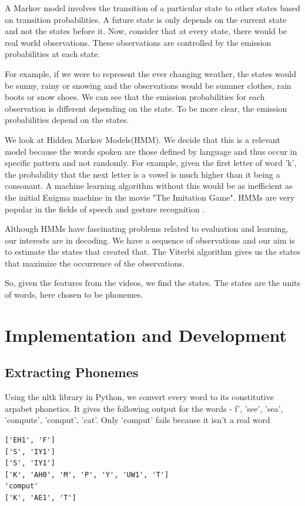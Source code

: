 \documentclass[a4paper]{article}
\begin{document}
A Markov model involves the transition of a particular state to other states based on transition probabilities. A future state is only depends on the current state and not the states before it. Now, consider that at every state, there would be real world observations. These observations are controlled by the emission probabilities at each state.

For example, if we were to represent the ever changing weather, the states would be sunny, rainy or snowing and the observations would be summer clothes, rain boots or snow shoes. We can see that the emission probabilities for each observation is different depending on the state. To be more clear, the emission probabilities depend on the states.

We look at Hidden Markov Models(HMM). We decide that this is a relevant model because the words spoken are those defined by language and thus occur in specific pattern and not randomly. For example, given the first letter of word 'k', the probability that the next letter is a vowel is much higher than it being a consonant. A machine learning algorithm without this would be as inefficient as the initial Enigma machine in the movie "The Imitation Game". HMMs are very popular in the fields of speech \cite{key-2} and gesture recognition \cite{key-4} \cite{key-5}.

Although HMMs have fascinating problems related to evaluation and learning, our interests are in decoding. We have a sequence of observations and our aim is to estimate the states that created that. The Viterbi algorithm \cite{key-3} gives us the states that maximize the occurrence of the observations. 

So, given the features from the videos, we find the states. The states are the units of words, here chosen to be phonemes. 
\section{Implementation and Development}

\subsection{Extracting Phonemes}

Using the nltk library in Python, we convert every word to its constitutive arpabet phonetics. It gives the following output for the words - f', 'see', 'sea', 'compute', 'comput', 'cat'. Only 'comput' fails because it isn't a real word
\begin{verbatim}
['EH1', 'F']
['S', 'IY1']
['S', 'IY1']
['K', 'AH0', 'M', 'P', 'Y', 'UW1', 'T']
'comput'
['K', 'AE1', 'T']
\end{verbatim}
\end{document}
